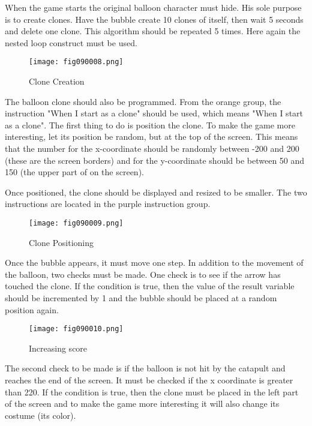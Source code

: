 When the game starts the original balloon character must hide. His sole purpose is to create clones. Have the bubble create 10 clones of itself, then wait 5 seconds and delete one clone. This algorithm should be repeated 5 times. Here again the nested loop construct must be used.

\begin{figure}[H]
   \centering
   \texttt{[image: fig090008.png]}
   \caption{Clone Creation}
\label{fig090008}
\end{figure}

The balloon clone should also be programmed. From the orange group, the instruction "When I start as a clone" should be used, which means "When I start as a clone". The first thing to do is position the clone. To make the game more interesting, let its position be random, but at the top of the screen. This means that the number for the x-coordinate should be randomly between -200 and 200 (these are the screen borders) and for the y-coordinate should be between 50 and 150 (the upper part of on the screen).

Once positioned, the clone should be displayed and resized to be smaller. The two instructions are located in the purple instruction group.

\begin{figure}[H]
   \centering
   \texttt{[image: fig090009.png]}
   \caption{Clone Positioning}
\label{fig090009}
\end{figure}

Once the bubble appears, it must move one step. In addition to the movement of the balloon, two checks must be made. One check is to see if the arrow has touched the clone. If the condition is true, then the value of the result variable should be incremented by 1 and the bubble should be placed at a random position again.

\begin{figure}[H]
   \centering
   \texttt{[image: fig090010.png]}
   \caption{Increasing score}
\label{fig090010}
\end{figure}

The second check to be made is if the balloon is not hit by the catapult and reaches the end of the screen. It must be checked if the x coordinate is greater than 220. If the condition is true, then the clone must be placed in the left part of the screen and to make the game more interesting it will also change its costume (its color).

